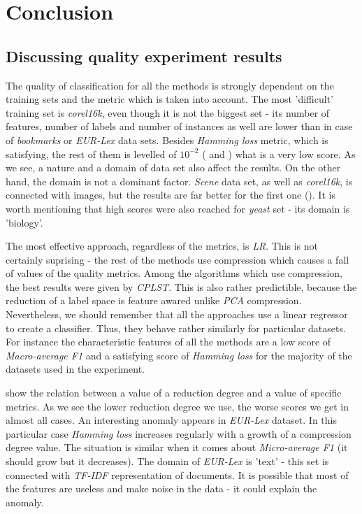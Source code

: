 \chapter{Conclusion}

\section{Discussing quality experiment results}

The quality of classification for all the methods is strongly dependent on the training sets and the metric which is taken into account. The most 'difficult' training set is \textit{corel16k}, even though it is not the biggest set - its number of features, number of labels and number of instances as well are lower than in case of \textit{bookmarks} or \textit{EUR-Lex} data sets. Besides \textit{Hamming loss} metric, which is satisfying, the rest of them is levelled of $10^{-2}$ ( and ) what is a very low score. As we see, a nature and a domain of data set also affect the results. On the other hand, the domain is not a dominant factor. \textit{Scene} data set, as well as \textit{corel16k}, is connected with images, but the results are far better for the first one (). It is worth mentioning that high scores were also reached for \textit{yeast} set - its domain is 'biology'.

The most effective approach, regardless of the metrics, is \textit{LR}. This is not certainly suprising - the rest of the methods use compression which causes a fall of values of the quality metrics. Among the algorithms which use compression, the best results were given by \textit{CPLST}. This is also rather predictible, because the reduction of a label space is feature awared unlike \textit{PCA} compression. Nevertheless, we should remember that all the approaches use a linear regressor to create a classifier. Thus, they behave rather similarly for particular datasets. For instance the characteristic features of all the methods are a low score of \textit{Macro-average F1} and a satisfying score of \textit{Hamming loss} for the majority of the datasets used in the experiment. 

 show the relation between a value of a reduction degree and a value of specific metrics. As we see the lower reduction degree we use, the worse scores we get in almost all cases. An interesting anomaly appears in \textit{EUR-Lex} dataset. In this particular case \textit{Hamming loss} increases regularly with a growth of a compression degree value. The situation is similar when it comes about \textit{Micro-average F1} (it should grow but it decreases). The domain of \textit{EUR-Lex} is 'text' - this set is connected with \textit{TF-IDF} representation of documents. It is possible that most of the features are useless and make noise in the data - it could explain the anomaly.  

